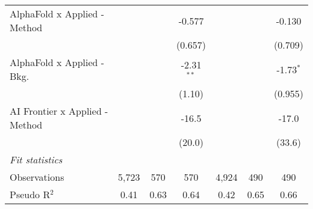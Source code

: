 \begin{tabular}{lcccccc}
   AlphaFold x Applied - Method   &              &             & -0.577       &              &         & -0.130\\   
                                  &              &             & (0.657)      &              &         & (0.709)\\   
   AlphaFold x Applied - Bkg.     &              &             & -2.31$^{**}$ &              &         & -1.73$^{*}$\\   
                                  &              &             & (1.10)       &              &         & (0.955)\\   
   AI Frontier x Applied - Method &              &             & -16.5        &              &         & -17.0\\   
                                  &              &             & (20.0)       &              &         & (33.6)\\   
   \midrule
   \emph{Fit statistics}\\
   Observations                   & 5,723        & 570         & 570          & 4,924        & 490     & 490\\  
   Pseudo R$^2$                   & 0.41         & 0.63        & 0.64         & 0.42         & 0.65    & 0.66\\  
   

\end{tabular}
